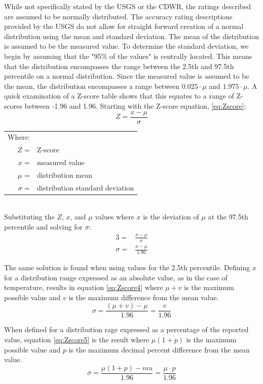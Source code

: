 \begin{linenumbers}
While not specifically stated by the USGS or the CDWR, the ratings described are assumed to be normally distributed.  The accuracy rating descriptions provided by the USGS do not allow for straight forward creation of a normal distribution using the mean and standard deviation.  The mean of the distribution is assumed to be the measured value.  To determine the standard deviation, we begin by assuming that the "95\% of the values" is centrally located.  This means that the distribution encompasses the range between the 2.5th and 97.5th percentile on a normal distribution.  Since the measured value is assumed to be the mean, the distribution encompasses a range between $0.025\cdot \mu$ and $1.975 \cdot \mu$.  A quick examination of a Z-score table shows that this equates to a range of Z-scores between -1.96 and 1.96.  Starting with the Z-score equation, \ref{eq:Zscore}:
\begin{equation}
	\label{eq:Zscore}
	Z=\frac{x-\mu}{\sigma}
\end{equation}
\begin{tabular}{r l}
Where:&\\
$Z$ = & Z-score\\
$x$ = & measured value\\
$\mu$ = & distribution mean\\
$\sigma$ = & distribution standard deviation\\
\end{tabular}\\

Substituting the $Z$, $x$, and $\mu$ values where $x$ is the deviation of $\mu$ at the 97.5th percentile and solving for $\sigma$:
\begin{align}
	\nonumber 3=&\frac{x-\mu}{\sigma}\\
	\sigma=&\frac{x-\mu}{1.96}
\end{align}

The same solution is found when using values for the 2.5th percentile.  Defining $x$ for a distribution range expressed as an absolute value, as in the case of temperature, results in equation \ref{eq:Zscore4} where $\mu+v$ is the maximum possible value and $v$ is the maximum difference from the mean value.  
\begin{equation}
	\label{eq:Zscore4}
	\sigma=\frac{(\mu+v)-\mu}{1.96}=\frac{v}{1.96}
\end{equation}

When defined for a distribution rage expressed as a percentage of the reported value, equation \ref{eq:Zscore5} is the result where $\mu(1+p)$ is the maximum possible value and $p$ is the maximum decimal percent difference from the mean value.
\begin{equation}
	\label{eq:Zscore5}
	\sigma=\frac{\mu(1+p)-mu}{1.96}=\frac{\mu \cdot p}{1.96}
\end{equation}


\end{linenumbers}
